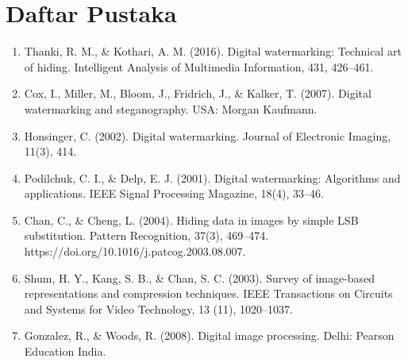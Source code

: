 \chapter{Daftar Pustaka}

\begin{enumerate}
	\item Thanki, R. M., \& Kothari, A. M. (2016). Digital watermarking: Technical art of hiding. Intelligent Analysis of Multimedia Information, 431, 426–461.
	\item Cox, I., Miller, M., Bloom, J., Fridrich, J., \& Kalker, T. (2007). Digital watermarking and steganography. USA: Morgan Kaufmann.
	\item Honsinger, C. (2002). Digital watermarking. Journal of Electronic Imaging, 11(3), 414.
	\item Podilchuk, C. I., \& Delp, E. J. (2001). Digital watermarking: Algorithms and applications. IEEE Signal Processing Magazine, 18(4), 33–46.
	\item Chan, C., \& Cheng, L. (2004). Hiding data in images by simple LSB substitution. Pattern Recognition, 37(3), 469–474. https://doi.org/10.1016/j.patcog.2003.08.007.
	\item Shum, H. Y., Kang, S. B., \& Chan, S. C. (2003). Survey of image-based representations and compression techniques. IEEE Transactions on Circuits and Systems for Video Technology, 13 (11), 1020–1037.
	\item Gonzalez, R., \& Woods, R. (2008). Digital image processing. Delhi: Pearson Education India.
\end{enumerate}